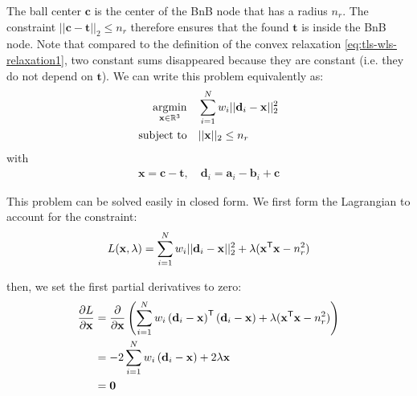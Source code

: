 The ball center $\mathbf{c}$ is the center of the BnB node that has a radius $n_r$. 
The constraint $||\mathbf{c} - \mathbf{t}||_2 \leq n_r$ therefore ensures  that the found $\mathbf{t}$ is inside the BnB node. Note that compared to the definition of the convex relaxation \ref{eq:tls-wls-relaxation1}, two constant sums disappeared because they are constant (i.e. they do not depend on $\mathbf{t}$). 
We can write this problem equivalently as:
\begin{equation}
	\label{eq:tls-twls-constrained}
	\begin{aligned}
		\operatorname*{argmin}_{\mathbf{x} \in \mathbb{R}^3} \quad &\sum_{i=1}^{N} w_i ||\mathbf{d}_i - \mathbf{x}||_2^2 \\
		\text{subject to} \quad  &||\mathbf{x}||_2 \leq n_r
	\end{aligned}
\end{equation}
with 
\begin{equation}
	\begin{aligned}
		\mathbf{x} = \mathbf{c} - \mathbf{t}, \quad \mathbf{d}_i = \mathbf{a}_i - \mathbf{b}_i + \mathbf{c}
	\end{aligned}
\end{equation}

This problem can be solved easily in closed form.
We first form the Lagrangian to account for the constraint:
\begin{equation}
	\begin{aligned}	
		L(\mathbf{x}, \lambda) =  \sum_{i=1}^{N} w_i ||\mathbf{d}_i - \mathbf{x}||_2^2 + \lambda (
		\mathbf{x}^{\mathsf{T}} \mathbf{x} - n_r^2)\\
	\end{aligned}
\end{equation}

then, we set the first partial derivatives to zero: 
\begin{equation}
	\begin{aligned}	
		\frac{\partial L}{\partial \mathbf{x}} &= \frac{\partial }{\partial \mathbf{x}} \left( \sum_{i=1}^{N} w_i \left(\mathbf{d}_i - \mathbf{x}\right)^{\mathsf{T}} \left(\mathbf{d}_i - \mathbf{x}\right) + \lambda (
		\mathbf{x}^{\mathsf{T}} \mathbf{x} - n_r^2) \right)\\
		&= - 2\sum_{i=1}^{N} w_i \left(\mathbf{d}_i - \mathbf{x}\right) + 2 \lambda \mathbf{x}\\
		&= \mathbf{0}\\
	\end{aligned}
\end{equation}


